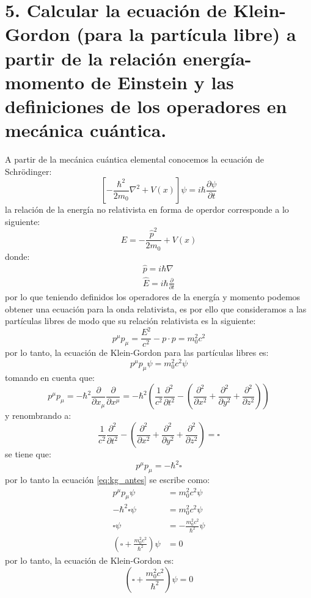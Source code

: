 \section*{5. Calcular la ecuación de Klein-Gordon (para la partícula libre) a partir de la relación energía-
momento de Einstein y las definiciones de los operadores en mecánica cuántica.}
A partir de la mecánica cuántica elemental conocemos la ecuación de Schr\"odinger:
 \begin{equation}
     \left[-\frac{\hbar^2}{2m_0} \nabla^2+V(x) \right]\psi = i\hbar \frac{\partial \psi}{\partial t}
 \end{equation}
 la relación de la energía no relativista en forma de operdor corresponde a lo siguiente:
 \begin{equation}
     E= -\frac{\hat{p}^2}{2m_0}+V(x)
 \end{equation}
 donde: 
 \begin{align*}
     \hat{p}=i\hbar \nabla\\
     \hat{E}=i\hbar \frac{\partial}{\partial t}
 \end{align*}
 por lo que teniendo definidos los operadores de la energía y momento  podemos obtener una ecuación para la onda relativista, es por ello que 
 consideramos a las partículas libres de modo que su relación relativista es la siguiente:
 \begin{equation}
     p^\mu p_\mu = \frac{E^2}{c^2}- p\cdot p = m_0^2c^2
 \end{equation}
por lo tanto, la ecuación de Klein-Gordon para las partículas libres es:
\begin{equation}
    p^\mu p_\mu \psi = m_0^2c^2 \psi
    \label{eq:kg_antes}
\end{equation}
tomando en cuenta que:
\begin{equation}
    p^\mu p_\mu = -\hbar^2 \frac{\partial }{\partial x_\mu}\frac{\partial }{\partial x^\mu} = -\hbar^2 \left(\frac{1}{c^2}\frac{\partial^2 }{\partial t^2} - \left(\frac{\partial^2 }{\partial x^2}+\frac{\partial^2 }{\partial y^2}+\frac{\partial^2 }{\partial z^2} \right) \right)
\end{equation}
y renombrando a:
\begin{equation*}
    \frac{1}{c^2}\frac{\partial^2 }{\partial t^2} - \left(\frac{\partial^2 }{\partial x^2}+\frac{\partial^2 }{\partial y^2}+\frac{\partial^2 }{\partial z^2} \right) = \square
\end{equation*}
se tiene que:
\begin{equation*}
    p^\mu p_\mu = -\hbar^2 \square
\end{equation*}
por lo tanto la ecuación \ref{eq:kg_antes} se escribe como:
\begin{align*}
    p^\mu p_\mu \psi &= m_0^2c^2 \psi \\
    -\hbar^2 \square \psi &= m_0^2c^2  \psi\\
    \square \psi &=-\frac{m_0^2c^2}{\hbar^2} \psi\\
    \left(\square+ \frac{m_0^2c^2}{\hbar^2}\right)\psi &=0
\end{align*}
por lo tanto, la ecuación de Klein-Gordon es:
\begin{equation}
    \left(\square+ \frac{m_0^2c^2}{\hbar^2}\right)\psi=0
    \label{eq:KG}
\end{equation}